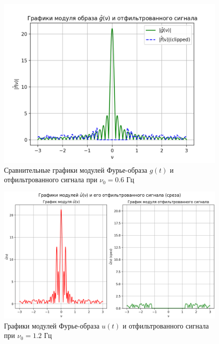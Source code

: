 \begin{figure}[ht!]
    \centering
    \includegraphics[scale=0.55]{media/1 task/low_freq/Fourier_Image_Comparison_4_2_2-0,5975975975975976.png}
    \caption{Сравнительные графики модулей Фурье-образа $g(t)$ и отфильтрованного сигнала при $\nu_0=0.6$ Гц}
    \label{fig:fourc_4_2_2_0.6}
\end{figure}

\begin{figure}[ht!]
    \centering
    \includegraphics[scale=0.55]{media/1 task/low_freq/Fourier_Image_4_2_2-1,1981981981981982.png}
    \caption{Графики модулей Фурье-образа $u(t)$ и отфильтрованного сигнала при $\nu_0=1.2$ Гц}
    \label{fig:four_4_2_2_1.2}
\end{figure}

